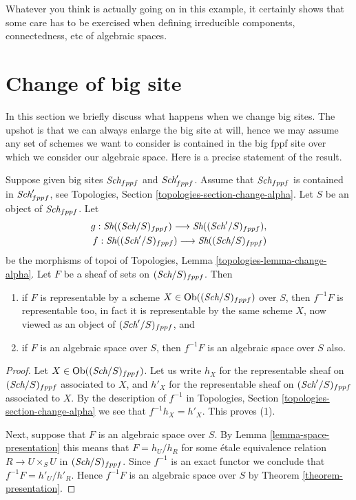 \noindent
Whatever you think is actually going on in this example, it certainly
shows that some care has to be exercised when defining irreducible
components, connectedness, etc of algebraic spaces.






\section{Change of big site}
\label{section-change-big-site}

\noindent
In this section we briefly discuss what happens when we change big sites.
The upshot is that we can always enlarge the big site at will, hence we
may assume any set of schemes we want to consider is contained in the big
fppf site over which we consider our algebraic space. Here is a precise
statement of the result.

\begin{lemma}
\label{lemma-change-big-site}
Suppose given big sites $\textit{Sch}_{fppf}$ and $\textit{Sch}'_{fppf}$.
Assume that $\textit{Sch}_{fppf}$ is contained in $\textit{Sch}'_{fppf}$,
see Topologies, Section \ref{topologies-section-change-alpha}.
Let $S$ be an object of $\textit{Sch}_{fppf}$. Let
\begin{align*}
g : \mathop{\textit{Sh}}\nolimits((\textit{Sch}/S)_{fppf})
\longrightarrow
\mathop{\textit{Sh}}\nolimits((\textit{Sch}'/S)_{fppf}), \\
f : \mathop{\textit{Sh}}\nolimits((\textit{Sch}'/S)_{fppf})
\longrightarrow
\mathop{\textit{Sh}}\nolimits((\textit{Sch}/S)_{fppf})
\end{align*}
be the morphisms of topoi of
Topologies, Lemma \ref{topologies-lemma-change-alpha}.
Let $F$ be a sheaf of sets on $(\textit{Sch}/S)_{fppf}$. Then
\begin{enumerate}
\item if $F$ is representable by a scheme
$X \in \mathop{\rm Ob}\nolimits((\textit{Sch}/S)_{fppf})$ over $S$,
then $f^{-1}F$ is representable too, in fact it is representable by the
same scheme $X$, now viewed as an object of $(\textit{Sch}'/S)_{fppf}$, and
\item if $F$ is an algebraic space over $S$, then $f^{-1}F$ is an algebraic
space over $S$ also.
\end{enumerate}
\end{lemma}

\begin{proof}
Let $X \in \mathop{\rm Ob}\nolimits((\textit{Sch}/S)_{fppf})$. Let us write $h_X$ for the
representable sheaf on $(\textit{Sch}/S)_{fppf}$ associated to $X$, and
$h'_X$ for the representable sheaf on $(\textit{Sch}'/S)_{fppf}$ associated to
$X$. By the description of $f^{-1}$ in
Topologies, Section \ref{topologies-section-change-alpha}
we see that $f^{-1}h_X = h'_X$. This proves (1).

\medskip\noindent
Next, suppose that $F$
is an algebraic space over $S$. By Lemma \ref{lemma-space-presentation}
this means that $F = h_U/h_R$ for some \'etale equivalence relation
$R \to U \times_S U$ in $(\textit{Sch}/S)_{fppf}$. Since $f^{-1}$ is an
exact functor we conclude that $f^{-1}F = h'_U/h'_R$. Hence
$f^{-1}F$ is an algebraic space over $S$ by Theorem \ref{theorem-presentation}.
\end{proof}

